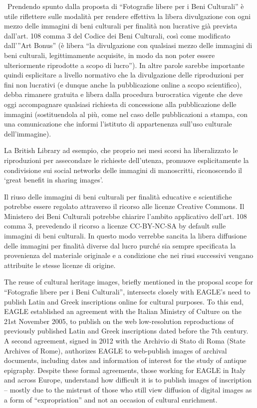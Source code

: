 \documentclass[amsthm,ebook]{saparticle}
\begin{document}
\ Prendendo spunto dalla proposta di “Fotografie libere per i Beni Culturali” è utile riflettere sulle modalità per
rendere effettiva la libera divulgazione con ogni mezzo delle immagini di beni culturali per finalità non lucrative già
prevista dall’art. 108 comma 3 del Codice dei Beni Culturali, così come modificato dall’”Art Bonus” (è libera “la
divulgazione con qualsiasi mezzo delle immagini di beni culturali, legittimamente acquisite, in modo da non poter
essere ulteriormente riprodotte a scopo di lucro”). In altre parole sarebbe importante quindi esplicitare a livello
normativo che la divulgazione delle riproduzioni per fini non lucrativi (e dunque anche la pubblicazione online a scopo
scientifico), debba rimanere gratuita e libera dalla procedura burocratica vigente che deve oggi accompagnare qualsiasi
richiesta di concessione alla pubblicazione delle immagini (sostituendola al più, come nel caso delle pubblicazioni a
stampa, con una comunicazione che informi l’istituto di appartenenza sull’uso culturale dell’immagine).

La British Library ad esempio, che proprio nei mesi scorsi ha liberalizzato le riproduzioni per assecondare le richieste
dell’utenza, promuove esplicitamente la condivisione sui social networks delle immagini di manoscritti, riconoscendo il
‘great benefit in sharing images’. 

Il riuso delle immagini di beni culturali per finalità educative e scientifiche potrebbe essere regolato attraverso il
ricorso alle licenze Creative Commons. Il Ministero dei Beni Culturali potrebbe chiarire l’ambito applicativo dell’art.
108 comma 3, prevedendo il ricorso a licenze CC-BY-NC-SA by default sulle immagini di beni culturali. In questo modo
verrebbe sancita la libera diffusione delle immagini per finalità diverse dal lucro purché sia sempre specificata la
provenienza del materiale originale e a condizione che nei riusi successivi vengano attribuite le stesse licenze di
origine. 


\bigskip

The reuse of cultural heritage images, briefly mentioned in the proposal scope for “Fotografie libere per i Beni
Culturali”, intersects closely with EAGLE’s need to publish Latin and Greek inscriptions online for cultural purposes.
To this end, EAGLE established an agreement with the Italian Ministry of Culture on the 21st November 2005, to publish
on the web low-resolution reproductions of previously published Latin and Greek inscriptions dated before the 7th
century. A second agreement, signed in 2012 with the Archivio di Stato di Roma (State Archives of Rome), authorizes
EAGLE to web-publish images of archival documents, including dates and information of interest for the study of antique
epigraphy. Despite these formal agreements, those working for EAGLE in Italy and across Europe, understand how
difficult it is to publish images of inscription – mostly due to the mistrust of those who still view diffusion of
digital images as a form of “expropriation” and not an occasion of cultural enrichment.
\end{document}
